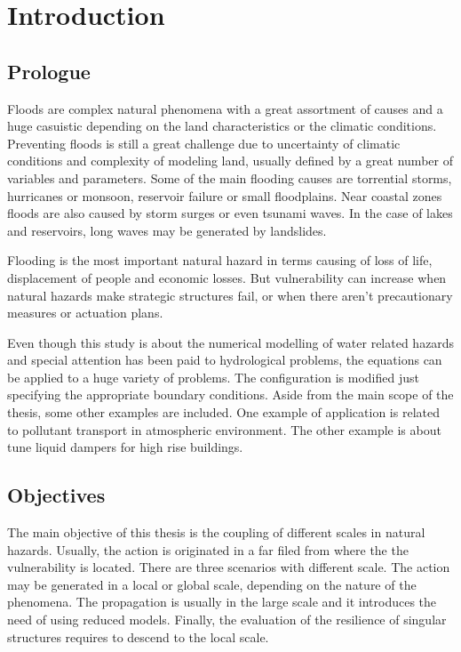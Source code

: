 
\chapter{Introduction}
\label{chapter_introduction}




\section{Prologue}


Floods are complex natural phenomena with a great assortment of causes and a huge casuistic
depending on the land characteristics or the climatic conditions. Preventing floods is still a great
challenge due to uncertainty of climatic conditions and complexity of modeling land, usually
defined by a great number of variables and parameters.
Some of the main flooding causes are torrential storms, hurricanes or monsoon, reservoir failure
or small floodplains. Near coastal zones floods are also caused by storm surges or even
tsunami waves. In the case of lakes and reservoirs, long waves may be generated by landslides.

Flooding is the most important natural hazard in terms causing of loss of life, displacement of
people and economic losses. But vulnerability can
increase when natural hazards make strategic structures fail, or when there aren't precautionary
measures or actuation plans.



Even though this study is about the numerical modelling of water related hazards and special attention has been paid to hydrological problems, the equations can be applied to a huge variety of problems. The configuration is modified just specifying the appropriate boundary conditions. Aside from the main scope of the thesis, some other examples are included. One example of application is related to pollutant transport in atmospheric environment. The other example is about tune liquid dampers for high rise buildings.




\section{Objectives} 


The main objective of this thesis is the coupling of different scales in natural hazards. Usually, the action is originated in a far filed from where the the vulnerability is located. There are three scenarios with different scale. The action may be generated in a local or global scale, depending on the nature of the phenomena. The propagation is usually in the large scale and it introduces the need of using reduced models. Finally, the evaluation of the resilience of singular structures requires to descend to the local scale.

